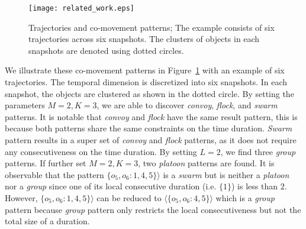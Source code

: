 % 
\begin{figure}[h]
\centering
\texttt{[image: related\_work.eps]}
\caption{Trajectories and co-movement patterns; The example consists of six trajectories across six snapshots. The
clusters of objects in each snapshots are denoted using dotted circles.}
\label{fig:related_work}
\end{figure}


We illustrate these co-movement patterns in Figure~\ref{fig:related_work} with an example of six trajectories.
The temporal dimension is discretized into six snapshots. 
In each snapshot, the objects are clustered as shown in the dotted circle.
By setting the parameters $M=2, K=3$, we are able to discover \emph{convoy}, \emph{flock}, and \emph{swarm} patterns. 
It is notable that \emph{convoy} and \emph{flock} have the same result pattern, this is because both patterns share 
the same constraints on the time duration. 
\emph{Swarm} pattern results in a super set of \emph{convoy} and \emph{flock} patterns, as it 
does not require any consecutiveness on the time duration. By setting $L=2$, we find three \emph{group} patterns. 
If further set $M=2,K=3$, two \emph{platoon} patterns are found. It is observable that the pattern $\{o_5,o_6:1,4,5\} \rangle$ is a \emph{swarm} but is neither a \emph{platoon} nor a \emph{group} since one of its local consecutive duration (i.e. $\{1\}$) is less than $2$. However, $\{o_5,o_6:1,4,5\} \rangle$ can be reduced to $\langle\{o_5,o_6:4,5\} \rangle$ which is a \emph{group} pattern because \emph{group} pattern only restricts the local consecutiveness but not the total size of a duration. 


